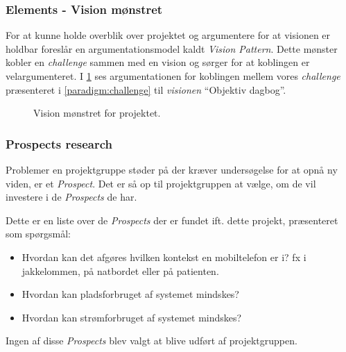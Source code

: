 \subsubsection{Elements - Vision mønstret}
For at kunne holde overblik over projektet og argumentere for at visionen er holdbar foreslår \citet[Kapitel 15 - Project]{art:essence} en argumentationsmodel kaldt \emph{Vision Pattern}. 
Dette mønster kobler en \emph{challenge} sammen med en vision og sørger for at koblingen er velargumenteret.
I \cref{fig:visionpattern} ses argumentationen for koblingen mellem vores \textit{challenge} præsenteret i \cref{paradigm:challenge} til \textit{visionen} ``Objektiv dagbog''.

\begin{figure}[h]
	\centering
	\resizebox{\columnwidth}{!}{
		}
	\caption{Vision mønstret for projektet.}
	\label{fig:visionpattern}
\end{figure}

\subsubsection{Prospects research}
Problemer en projektgruppe støder på der kræver undersøgelse for at opnå ny viden, er et \textit{Prospect}.
Det er så op til projektgruppen at vælge, om de vil investere i de \textit{Prospects} de har. \cite[nederst på side 104]{art:essence}

Dette er en liste over de \textit{Prospects} der er fundet ift. dette projekt, præsenteret som spørgsmål:
\begin{itemize}
	\item Hvordan kan det afgøres hvilken kontekst en mobiltelefon er i? fx i jakkelommen, på natbordet eller på patienten.
	\item Hvordan kan pladsforbruget af systemet mindskes?
	\item Hvordan kan strømforbruget af systemet mindskes?
\end{itemize}
Ingen af disse \textit{Prospects} blev valgt at blive udført af projektgruppen.
